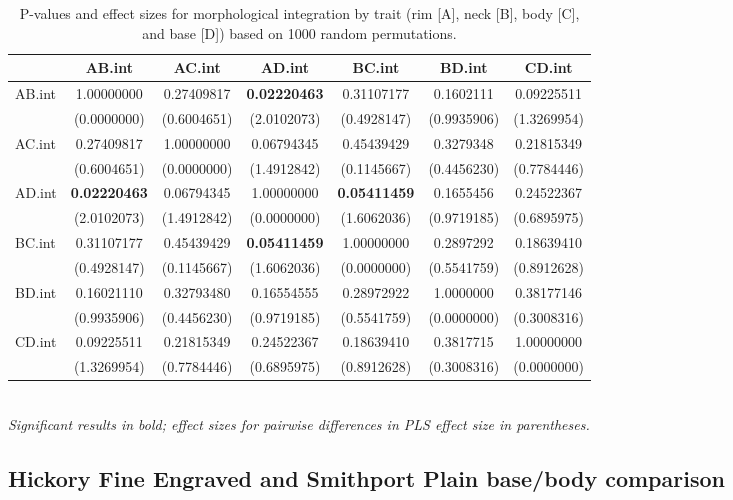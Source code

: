 \documentclass[review]{elsarticle}
\begin{document}
\begin{table}[htbp]\centering
\footnotesize
\caption{P-values and effect sizes for morphological integration by trait (rim [A], neck [B], body [C], and base [D]) based on 1000 random permutations.}
\centering
\begin{tabular}{lcccccc}
\toprule
 & AB.int & AC.int & AD.int & BC.int & BD.int & CD.int\\
\midrule
AB.int & 1.00000000 & 0.27409817 & \textbf{0.02220463} & 0.31107177 & 0.1602111 & 0.09225511\\
	   & (0.0000000) & (0.6004651) & (2.0102073) & (0.4928147) & (0.9935906) & (1.3269954)\\
AC.int & 0.27409817 & 1.00000000 & 0.06794345 & 0.45439429 & 0.3279348 & 0.21815349\\
	   & (0.6004651) & (0.0000000) & (1.4912842) & (0.1145667) & (0.4456230) & (0.7784446)\\
AD.int & \textbf{0.02220463} & 0.06794345 & 1.00000000 & \textbf{0.05411459} & 0.1655456 & 0.24522367\\
	   & (2.0102073) & (1.4912842) & (0.0000000) & (1.6062036) & (0.9719185) & (0.6895975)\\
BC.int & 0.31107177 & 0.45439429 & \textbf{0.05411459} & 1.00000000 & 0.2897292 & 0.18639410\\
	   & (0.4928147) & (0.1145667) & (1.6062036) & (0.0000000) & (0.5541759) & (0.8912628)\\
BD.int & 0.16021110 & 0.32793480 & 0.16554555 & 0.28972922 & 1.0000000 & 0.38177146\\
	   & (0.9935906) & (0.4456230) & (0.9719185) & (0.5541759) & (0.0000000) & (0.3008316)\\
CD.int & 0.09225511 & 0.21815349 & 0.24522367 & 0.18639410 & 0.3817715 & 1.00000000\\
	   & (1.3269954) & (0.7784446) & (0.6895975) & (0.8912628) & (0.3008316) & (0.0000000)\\
\bottomrule
\end{tabular}\\
\smallskip
\textit{Significant results in bold; effect sizes for pairwise differences in PLS effect size in parentheses.}\\
\label{tab:Tblmorphinteg}
\end{table}

\subsection{Hickory Fine Engraved and Smithport Plain base/body comparison}
\end{document}
